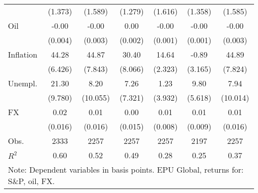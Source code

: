 \begin{table}[htbp]
\begin{tabular*}{0.8\hsize}{@{\hskip\tabcolsep\extracolsep\fill}l*{6}{c}}
                    &     (1.373)         &     (1.589)         &     (1.279)         &     (1.616)         &     (1.358)         &     (1.585)         \\
\addlinespace
Oil                 &       -0.00         &       -0.00         &        0.00         &       -0.00\sym{**} &       -0.00         &       -0.00         \\
                    &     (0.004)         &     (0.003)         &     (0.002)         &     (0.001)         &     (0.001)         &     (0.003)         \\
\addlinespace
Inflation           &       44.28\sym{***}&       44.87\sym{***}&       30.40\sym{**} &       14.64\sym{***}&       -0.89         &       44.89\sym{***}\\
                    &     (6.426)         &     (7.843)         &     (8.066)         &     (2.323)         &     (3.165)         &     (7.824)         \\
\addlinespace
Unempl.             &       21.30\sym{*}  &        8.20         &        7.26         &        1.23         &        9.80         &        7.94         \\
                    &     (9.780)         &    (10.055)         &     (7.321)         &     (3.932)         &     (5.618)         &    (10.014)         \\
\addlinespace
FX                  &        0.02         &        0.01         &        0.00         &        0.01         &        0.01         &        0.01         \\
                    &     (0.016)         &     (0.016)         &     (0.015)         &     (0.008)         &     (0.009)         &     (0.016)         \\
\midrule
Obs.        &        2333         &        2257         &        2257         &        2257         &        2197         &        2257         \\
\(R^{2}\)           &        0.60         &        0.52         &        0.49         &        0.28         &        0.25         &        0.37         \\
\bottomrule
\multicolumn{7}{l}{\footnotesize Note: Dependent variables in basis points. EPU Global, returns for: S\&P, oil, FX.}\\
\end{tabular*}
\end{table}
